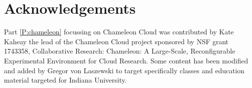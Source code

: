 \section{Acknowledgements}

Part \ref{P:chameleon} focussing on Chameleon Cloud was contributed by
Kate Kaheay the lead of the Chameleon Cloud project sponsored by NSF
grant 1743358, Collaborative Research: Chameleon: A Large-Scale,
Reconfigurable Experimental Environment for Cloud Research. Some
content has been modified and added by Gregor von Laszewski to target
specifically classes and education material targeted for Indiana
University.

